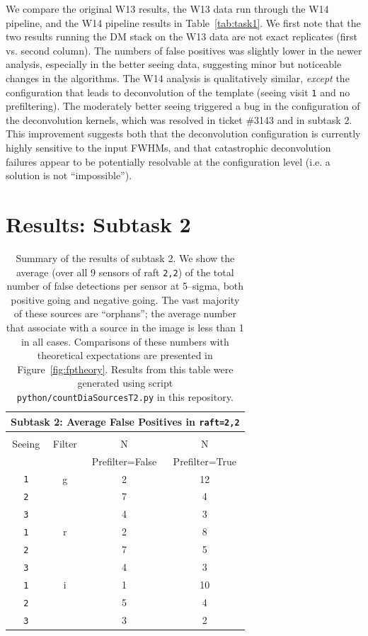 \documentclass[DM,toc]{lsstdoc}
\begin{document}
We compare the original W13 results, the W13 data run through the W14
pipeline, and the W14 pipeline results in Table~\ref{tab:task1}.  We
first note that the two results running the DM stack on the W13 data
are not exact replicates (first vs. second column). The numbers of
false positives was slightly lower in the newer analysis, especially
in the better seeing data, suggesting minor but noticeable changes in
the algorithms.  The W14 analysis is qualitatively similar, {\it
  except} the configuration that leads to deconvolution of the
template (seeing visit {\tt 1} and no prefiltering).  The moderately
better seeing triggered a bug in the configuration of the
deconvolution kernels, which was resolved in ticket \#3143 and in
subtask 2.  This improvement suggests both that the deconvolution
configuration is currently highly sensitive to the input FWHMs, and
that catastrophic deconvolution failures appear to be potentially
resolvable at the configuration level (i.e. a solution is not
``impossible'').

\section{Results: Subtask 2 \label{sec:task2}}

\begin{table}
\centering
\begin{tabular}{cccc}
\hline
\multicolumn{4}{|c|}{Subtask 2: Average False Positives in {\tt raft=2,2}} \\ \hline \\
Seeing   & Filter & N & N  \\
         &        & Prefilter=False & Prefilter=True   \\
\hline
{\tt 1}  & g      & 2 & 12    \\
{\tt 2}  &        & 7 & 4    \\
{\tt 3}  &        & 4 & 3    \\
\hline
{\tt 1}  & r      & 2 & 8    \\
{\tt 2}  &        & 7 & 5    \\
{\tt 3}  &        & 4 & 3    \\
\hline
{\tt 1}  & i      & 1 & 10    \\
{\tt 2}  &        & 5 & 4    \\
{\tt 3}  &        & 3 & 2    \\
\end{tabular}
\caption[]{Summary of the results of subtask 2.  We show the average
  (over all 9 sensors of raft {\tt 2,2}) of the total number of false
  detections per sensor at 5--sigma, both positive going and negative
  going.  The vast majority of these sources are ``orphans''; the
  average number that associate with a source in the image is less
  than 1 in all cases.  Comparisons of these numbers with theoretical
  expectations are presented in Figure~\ref{fig:fptheory}.  Results
  from this table were generated using script {\tt
    python/countDiaSourcesT2.py} in this repository.}
\label{tab:task2}
\end{table}
\end{document}
